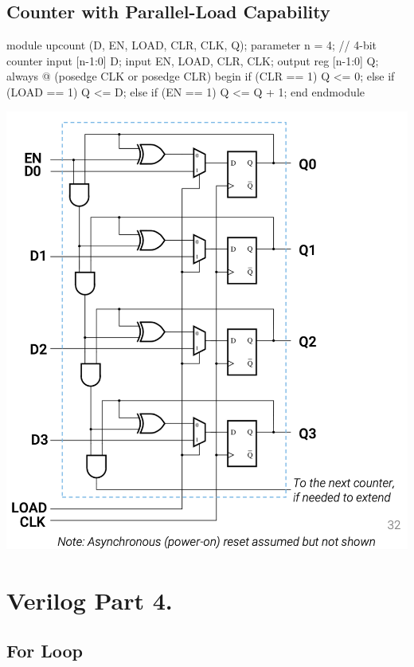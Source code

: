 \documentclass[12pt,openany]{book}
\begin{document}
\subsection{Counter with Parallel-Load Capability}
\begin{minipage}[htp]{0.4\textwidth}
\begin{vhdl}
module upcount (D, EN, LOAD, CLR, CLK, Q);
parameter n = 4; // 4-bit counter
input [n-1:0] D;
input EN, LOAD, CLR, CLK;
output reg [n-1:0] Q;
	always @ (posedge CLK or posedge CLR)
	begin
		if (CLR == 1) Q <= 0;
		else if (LOAD == 1) Q <= D;
		else if (EN == 1) Q <= Q + 1;
	end
endmodule
\end{vhdl}
\end{minipage}
\hfill
\vline
\hfill
\begin{minipage}[htp]{0.4\textwidth}
\includegraphics[width=1.3\textwidth]{circuits/14.5_3.png}
\end{minipage}	
\section{Verilog Part 4.}
\subsection{For Loop}
\end{document}
